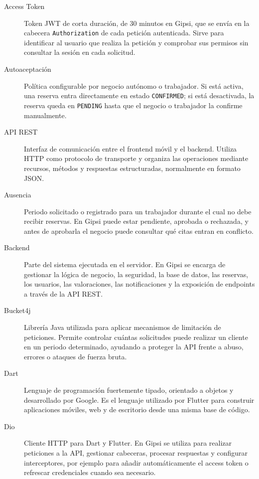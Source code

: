 \documentclass[12pt,a4paper,twoside]{report}
\begin{document}
\begin{description}

  \item[Access Token]
  Token JWT de corta duración, de 30 minutos en Gipsi, que se envía en la cabecera
  \texttt{Authorization} de cada petición autenticada. Sirve para identificar al usuario
  que realiza la petición y comprobar sus permisos sin consultar la sesión en cada
  solicitud.

  \item[Autoaceptación]
  Política configurable por negocio autónomo o trabajador. Si está activa, una reserva
  entra directamente en estado \texttt{CONFIRMED}; si está desactivada, la reserva queda
  en \texttt{PENDING} hasta que el negocio o trabajador la confirme manualmente.

  \item[API REST]
  Interfaz de comunicación entre el frontend móvil y el backend. Utiliza HTTP como
  protocolo de transporte y organiza las operaciones mediante recursos, métodos y
  respuestas estructuradas, normalmente en formato JSON.

  \item[Ausencia]
  Periodo solicitado o registrado para un trabajador durante el cual no debe recibir
  reservas. En Gipsi puede estar pendiente, aprobada o rechazada, y antes de aprobarla
  el negocio puede consultar qué citas entran en conflicto.

  \item[Backend]
  Parte del sistema ejecutada en el servidor. En Gipsi se encarga de gestionar la lógica
  de negocio, la seguridad, la base de datos, las reservas, los usuarios, las valoraciones,
  las notificaciones y la exposición de endpoints a través de la API REST.

  \item[Bucket4j]
  Librería Java utilizada para aplicar mecanismos de limitación de peticiones. Permite
  controlar cuántas solicitudes puede realizar un cliente en un periodo determinado,
  ayudando a proteger la API frente a abuso, errores o ataques de fuerza bruta.

  \item[Dart]
  Lenguaje de programación fuertemente tipado, orientado a objetos y desarrollado por
  Google. Es el lenguaje utilizado por Flutter para construir aplicaciones móviles,
  web y de escritorio desde una misma base de código.

  \item[Dio]
  Cliente HTTP para Dart y Flutter. En Gipsi se utiliza para realizar peticiones a la API,
  gestionar cabeceras, procesar respuestas y configurar interceptores, por ejemplo para
  añadir automáticamente el access token o refrescar credenciales cuando sea necesario.


\end{description}
\end{document}
